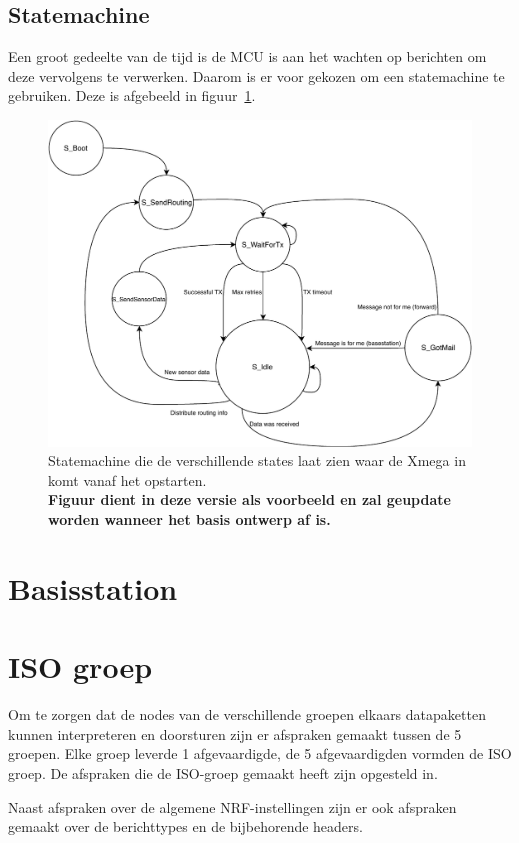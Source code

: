 \documentclass[a4paper, 11pt]{article}
\begin{document}
\subsection{Statemachine}
Een groot gedeelte van de tijd is de MCU is aan het wachten op berichten om deze vervolgens te verwerken. Daarom is er voor gekozen om een statemachine te gebruiken. Deze is afgebeeld in figuur~\ref{fig:Statemachine}.


\begin{figure}[!ht]
	\includegraphics[width=.8\textwidth, keepaspectratio]{media/PState.pdf}
    \caption{Statemachine die de verschillende states laat zien waar de Xmega in komt vanaf het opstarten.\\ \textbf{Figuur dient in deze versie als voorbeeld en zal geupdate worden wanneer het basis ontwerp af is.}}
    \label{fig:Statemachine}
\end{figure}

\section{Basisstation}

\section{ISO groep}
Om te zorgen dat de nodes van de verschillende groepen elkaars datapaketten kunnen interpreteren en doorsturen zijn er afspraken gemaakt tussen de 5 groepen. Elke groep leverde 1 afgevaardigde, de 5 afgevaardigden vormden de ISO groep. De afspraken die de ISO-groep gemaakt heeft zijn opgesteld in\cite{ISO}. 

Naast afspraken over de algemene NRF-instellingen zijn er ook afspraken gemaakt over de berichttypes en de bijbehorende headers.
\end{document}
